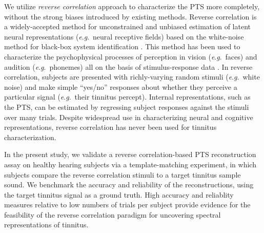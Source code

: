 \documentclass[journal]{IEEEtran}
\newcommand{\eg}{\textit{e}.\textit{g}.\ }
\begin{document}
We utilize \textit{reverse correlation} approach to characterize the PTS more completely,
without the strong biases introduced by existing methods.
Reverse correlation is a widely-accepted method for unconstrained and unbiased estimation
of latent neural representations (\eg neural receptive fields)
based on the white-noise method for black-box system identification
\cite{ringachReverseCorrelationNeurophysiology2004,ljungMeasureLackFit1978}.
This method has been used to characterize the psychophysical processes of perception
in vision (\eg faces) and audition (\eg phonemes)
\cite{ahumadaStimulusFeaturesSignal1971,gosselinSuperstitiousPerceptionsReveal2003,brimijoinInternalRepresentationVowel2013}
all on the basis of stimulus-response data
\cite{marmarelisWhiteNoiseMethodSystem1978,neriReceptivePerceptiveFields2006}.
In reverse correlation, subjects are presented with richly-varying random stimuli (\eg white noise)
and make simple ``yes/no'' responses about whether they perceive a particular signal
(\eg their tinnitus percept).
Internal representations, such as the PTS, can be estimated
by regressing subject responses against the stimuli over many trials.
Despite widespread use in characterizing neural and cognitive representations,
reverse correlation has never been used for tinnitus characterization.


In the present study, we validate a reverse correlation-based PTS reconstruction assay
on healthy hearing subjects via a template-matching experiment,
in which subjects compare the reverse correlation stimuli to a target tinnitus sample sound.
We benchmark the accuracy and reliability of the reconstructions,
using the target tinnitus signal as a ground truth.
High accuracy and reliablity measures relative to low numbers of trials per subject
provide evidence for the feasibility of the reverse correlation paradigm for uncovering
spectral representations of tinnitus.
\end{document}
